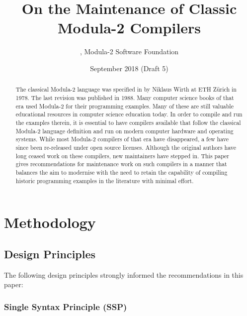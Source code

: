 \documentclass[10pt,a4paper]{article}
\title{On the Maintenance of Classic Modula-2 Compilers}
\author{\BK, Modula-2 Software Foundation}
\date{September 2018 (Draft 5)}
\makeatletter
\newcommand{\verbatimfont}[1]{\def\verbatim@font{#1}}
\makeatother
\begin{document}
\verbatimfont{\small\fontfamily{lmtt}\selectfont}
\maketitle

\begin{abstract}
The classical Modula-2 language was specified in \cite{Wirth78} by Niklaus
Wirth at ETH Z\"{u}rich in 1978. The last revision \cite{Wirth88} was
published in 1988. Many computer science books of that era used Modula-2 for
their programming examples. Many of these are still valuable educational
resources in computer science education today. In order to compile and run the
examples therein, it is essential to have compilers available that follow the
classical Modula-2 language definition and run on modern computer hardware and
operating systems. While most Modula-2 compilers of that era have disappeared,
a few have since been re-released under open source licenses. Although the
original authors have long ceased work on these compilers, new maintainers
have stepped in. This paper gives recommendations for maintenance work on such
compilers in a manner that balances the aim to modernise with the need to
retain the capability of compiling historic programming examples in the
literature with minimal effort.
\end{abstract}


\section{Methodology}

\subsection{Design Principles}
\label{design-principles}

The following design principles strongly informed the recommendations in this
paper:

\subsubsection{Single Syntax Principle (SSP)}
\label{SSP}
\end{document}
